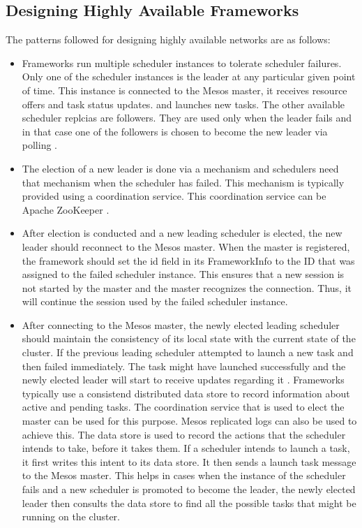\documentclass[9pt,twocolumn,twoside]{../../styles/osajnl}
\begin{document}
\subsection{Designing Highly Available Frameworks}
The patterns followed for designing highly available networks are as follows:
\begin{itemize}
\item Frameworks run multiple scheduler instances to tolerate
  scheduler failures. Only one of the scheduler instances is the
  leader at any particular given point of time. This instance is
  connected to the Mesos master, it receives resource offers and task
  status updates. and launches new tasks. The other available
  scheduler replcias are followers. They are used only when the leader
  fails and in that case one of the followers is chosen to become the
  new leader via polling \cite{www-mesos-frmwrk}.
\item The election of a new leader is done via a mechanism and
  schedulers need that mechanism when the scheduler has failed. This
  mechanism is typically provided using a coordination service. This
  coordination service can be Apache ZooKeeper \cite{www-mesos-frmwrk}.
 \item After election is conducted and a new leading scheduler is
   elected, the new leader should reconnect to the Mesos master. When
   the master is registered, the framework should set the id field in
   its FrameworkInfo to the ID that was assigned to the failed
   scheduler instance. This ensures that a new session is not started
   by the master and the master recognizes the connection. Thus, it
   will continue the session used by the failed scheduler instance.
 \item After connecting to the Mesos master, the newly elected leading
   scheduler should maintain the consistency of its local state with
   the current state of the cluster. If the previous leading scheduler
   attempted to launch a new task and then failed immediately. The
   task might have launched successfully and the newly elected leader
   will start to receive updates regarding it
   \cite{www-mesos-frmwrk}. Frameworks typically use a consistend
   distributed data store to record information about active and
   pending tasks. The coordination service that is used to elect the
   master can be used for this purpose. Mesos replicated logs can also
   be used to achieve this. The data store is used to record the
   actions that the scheduler intends to take, before it takes
   them. If a scheduler intends to launch a task, it first writes this
   intent to its data store. It then sends a launch task message to
   the Mesos master. This helps in cases when the instance of the
   scheduler fails and a new scheduler is promoted to become the
   leader, the newly elected leader then consults the data store to
   find all the possible tasks that might be running on the cluster.


\end{itemize}
\end{document}
